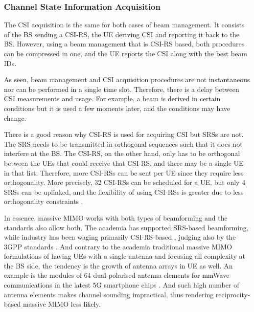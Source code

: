 \subsubsection*{Channel State Information Acquisition}

The CSI acquisition is the same for both cases of beam management. It consists of the BS sending a CSI-RS, the UE deriving CSI and reporting it back to the BS. However, using a beam management that is CSI-RS based, both procedures can be compressed in one, and the UE reports the CSI along with the best beam IDs.

As seen, beam management and CSI acquisition procedures are not instantaneous nor can be performed in a single time slot. Therefore, there is a delay between CSI measurements and usage. For example, a beam is derived in certain conditions but it is used a few moments later, and the conditions may have change. 

There is a good reason why CSI-RS is used for acquiring CSI but SRSs are not. The SRS needs to be transmitted in orthogonal sequences such that it does not interfere at the BS. The CSI-RS, on the other hand, only has to be orthogonal between the UEs that could receive that CSI-RS, and there may be a single UE in that list. Therefore, more CSI-RSs can be sent per UE since they require less orthogonality. More precisely, 32 CSI-RSs can be scheduled for a UE, but only 4 SRSs can be uplinked, and the flexibility of using CSI-RSs is greater due to less orthogonality constraints \cite{DAHLMAN2018}.

In essence, massive MIMO works with both types of beamforming and the standards also allow both. The academia has supported SRS-based beamforming, while industry has been waging primarily CSI-RS-based \cite{tddVSfdd_massiveMIMO}, judging also by the 3GPP standards \cite{3gpp-codebooks}. And contrary to the academia traditional massive MIMO formulations of having UEs with a single antenna and focusing all complexity at the BS side, the tendency is the growth of antenna arrays in \acs{UE} as well. An example is the modules of 64 dual-polarised antenna elements for mmWave communications in the latest 5G smartphone chips \cite{qualcomm_64_antenna}. And such high number of antenna elements makes channel sounding impractical, thus rendering reciprocity-based massive MIMO less likely.

